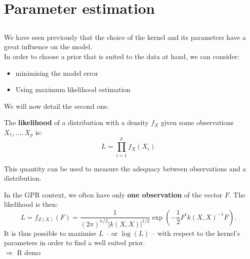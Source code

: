 \section[Param. estim.]{Parameter estimation}
\subsection{}

\begin{frame}{}
We have seen previously that the choice of the kernel and its parameters have a great influence on the model. \\ \vspace{5mm}
In order to choose a prior that is suited to the data at hand, we can consider:
\begin{itemize}
	\item minimising the model error
	\item Using maximum likelihood estimation
\end{itemize}
We will now detail the second one.
\end{frame}

\begin{frame}{}
\begin{definition}
The \textbf{likelihood} of a distribution with a density $f_X$ given some observations $X_1, \dots,X_p$ is:
\begin{equation*}
 	L = \prod_{i=1}^p f_X(X_i)
\end{equation*}
\end{definition}
This quantity can be used to measure the adequacy between observations and a distribution.\\ \vspace{3mm}
\end{frame}

\begin{frame}{}
In the GPR context, we often have only \textbf{one observation} of the vector $F$. The likelihood is then:
\begin{equation*}
 	L = f_{Z(X)}(F) = \frac{1}{\displaystyle (2 \pi)^{n/2} |k(X,X)|^{1/2}} \exp \left(-\frac12 F^t k(X,X)^{-1} F  \right).
\end{equation*}
It is thus possible to maximise $L$ -- or $\log(L)$ -- with respect to the kernel's parameters in order to find a well suited prior.\\
\vspace{5mm}
\alert{$\Rightarrow$ R demo}
\end{frame}


